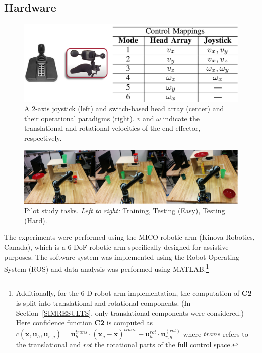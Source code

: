 \documentclass[conference]{IEEEtran}
\begin{document}
 \subsection{Hardware}\label{HARDWARE}
 

\begin{figure}[h]
	\centering
	\includegraphics[width = 1\hsize, height = 0.14\vsize]{./figures/INTER_3.png}
	\vspace{-0.3cm}
	\caption{A 2-axis joystick (left) and switch-based head array (center) and their operational paradigms (right). $v$ and $\omega$ indicate the translational and rotational velocities of the end-effector, respectively.}
	\label{J2_HA}
\end{figure}
\begin{figure}[ht]
	\centering
	\includegraphics[width = 1\hsize]{./figures/TASKS.png}
	\caption{Pilot study tasks. \textit{Left to right:} Training, Testing (Easy), Testing (Hard).}
	\label{TASKS}
\end{figure}
 The experiments were performed using the MICO robotic arm (Kinova Robotics, Canada), which is a 6-DoF robotic arm specifically designed for assistive purposes. The software system was implemented using the Robot Operating System (ROS) and data analysis was performed using MATLAB.\footnote{Additionally, for the 6-D robot arm implementation, the computation of \textbf{C2} is split into translational and rotational components. (In Section~\ref{SIMRESULTS}, only translational components were considered.) Here confidence function \textbf{C2} is computed as
 	$c(\boldsymbol{x}, \boldsymbol{u}_h, \boldsymbol{u}_{r,g}) = \boldsymbol{u}_{h}^{trans}\cdot(\boldsymbol{x}_{g} - \boldsymbol{x})^{trans} + \boldsymbol{u}_h^{rot}\cdot\boldsymbol{u}_{r,g}^{(rot)}$
 	where $trans$ refers to the translational and $rot$ the rotational parts of the full control space.}
 
\end{document}
